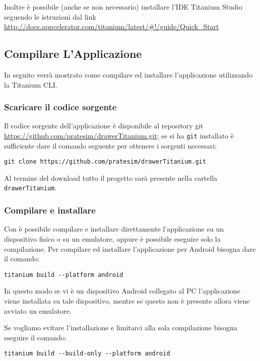     Inoltre è possibile (anche se non necessario) installare l'IDE Titanium
    Studio seguendo le istruzioni dal link \url{http://docs.appcelerator.com/titanium/latest/#!/guide/Quick_Start}
    \subsection{Compilare L'Applicazione}
    In seguito verrà mostrato come compilare ed installare l'applicazione
    utilizzando la Titanium CLI.
        \subsubsection{Scaricare il codice sorgente}
        Il codice sorgente dell'applicazione \tisdk{} è disponibile al 
            repository git 
            \url{https://github.com/pratesim/drawerTitanium.git}; se si ha 
            \texttt{git} installato è sufficiente dare il comando seguente per 
            ottenere i sorgenti necessari:
            \begin{lstlisting}[language=plane]
 git clone https://github.com/pratesim/drawerTitanium.git
            \end{lstlisting}
            Al termine del download tutto il progetto sarà presente nella 
            cartella \texttt{drawerTitanium}.
        \subsubsection{Compilare e installare}
            Con \tisdk{} è possibile compilare e installare direttamente
            l'applicazione su un dispositivo fisico o su un emulatore, oppure
            è possibile eseguire solo la compilazione.
            Per compilare ed installare l'applicazione per Android 
            bisogna dare il comando:
        \begin{lstlisting}[language=plane]
 titanium build --platform android
        \end{lstlisting}
        In questo modo se vi è un dispositivo Android collegato al PC
        l'applicazione viene installata su tale dispositivo, mentre se questo
        non è presente allora viene avviato un emulatore.

        Se vogliamo evitare l'installazione e limitarci alla sola compilazione
        bisogna eseguire il comando:
        \begin{lstlisting}[language=plane]
 titanium build --build-only --platform android
        \end{lstlisting}
